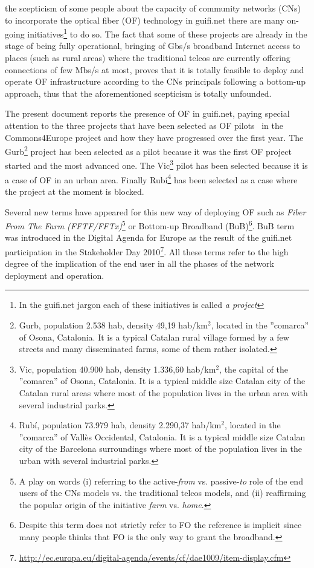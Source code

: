  the scepticism of some people about the capacity of community networks (CNs) to incorporate the optical fiber (OF) technology in guifi.net there are many on-going initiatives\footnote{In the guifi.net jargon each of these initiatives is called \emph{a project}} to do so. The fact that some of these projects are already in the stage of being fully operational, bringing of Gbs/s broadband Internet access to places (such as rural areas) where the traditional telcos are currently offering connections of few Mbs/s at most, proves that it is totally feasible to deploy and operate OF infrastructure according to the CNs principals following a bottom-up approach, thus that the aforementioned scepticism is totally unfounded.

The present document reports the presence of OF in guifi.net, paying special attention to the three projects that have been selected as OF pilots~\cite{barcelo2012bub} in the Commons4Europe project and how they have progressed over the first year. The Gurb\footnote{Gurb, population 2.538 hab, density 49,19 hab/km$^{2}$, located in the ''comarca'' of Osona, Catalonia. It is a typical Catalan rural village formed by a few streets and many disseminated farms, some of them rather isolated.} project has been selected as a pilot because it was the first OF project started and the most advanced one. The Vic\footnote{Vic, population 40.900 hab, density 1.336,60 hab/km$^{2}$, the capital of the ''comarca'' of Osona, Catalonia. It is a typical middle size Catalan city of the Catalan rural areas where most of the population lives in the urban area with several industrial parks.} pilot has been selected because it is a case of OF in an urban area. Finally Rub\'{i}\footnote{Rub\'{i}, population 73.979 hab, density 2.290,37 hab/km$^{2}$, located in the ''comarca'' of Vall\`{e}s Occidental, Catalonia. It is a typical middle size Catalan city of the Barcelona surroundings where most of the population lives in the urban with several industrial parks.} has been selected as a case where the project at the moment is blocked.

Several new terms have appeared for this new way of deploying OF such as \emph{Fiber From The Farm (FFTF/FFTx)}\footnote{A play on words (i) referring to the active-\emph{from} vs. passive-\emph{to} role of the end users of the CNs models vs. the traditional telcos models, and (ii) reaffirming the popular origin of the initiative \emph{farm} vs. \emph{home}. } or Bottom-up Broadband (BuB)\footnote{Despite this term does not strictly refer to FO the reference is implicit since many people thinks that FO is the only way to grant the broadband.}. BuB term was introduced in the Digital Agenda for Europe as the result of the guifi.net participation in the Stakeholder Day 2010\footnote{\url{http://ec.europa.eu/digital-agenda/events/cf/dae1009/item-display.cfm}}. All these terms refer to the high degree of the implication of the end user in all the phases of the network deployment and operation.

